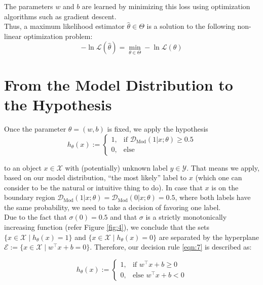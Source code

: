 The parameters $w$ and $b$ are learned by minimizing this loss using optimization algorithms such as gradient descent.\cite{murphy2012machine}\\

Thus, a maximum likelihood estimator $\hat{\theta} \in \Theta$ is a solution to the following non-linear optimization problem:
\begin{equation}
    -\ln \mathcal{L}(\hat{\theta}) = \min_{\theta \in \Theta} - \ln \mathcal{L}(\theta)
    \label{eqn:6}
\end{equation}

\section{From the Model Distribution to the Hypothesis} \label{hypothesis}

Once the parameter $\theta=(w,b)$ is fixed, we apply the hypothesis
\begin{equation}
    h_{\theta}(x) :=
    \begin{cases} 
        1, & \text{if } \mathcal{D}_{\text{Mod}}(1|x;\theta) \geq 0.5 \\
        0, & \text{else}
    \end{cases}
    \label{eqn:7}
\end{equation}

to an object $x \in \mathcal{X}$ with (potentially) unknown label $y \in \mathcal{Y}$. That means we apply, based on our model distribution, “the most likely” label to $x$ (which one can consider to be the natural or intuitive thing to do). In case that $x$ is on the boundary region $\mathcal{D}_{\text{Mod}}(1|x;\theta) = \mathcal{D}_{\text{Mod}}(0|x;\theta) = 0.5$, where both labels have the same probability, we need to take a decision of favoring one label.\\

Due to the fact that $\sigma(0)=0.5$ and that $\sigma$ is a strictly monotonically increasing function (refer Figure \ref{fig:4}), we conclude that the sets $\{ x \in \mathcal{X} \mid h_{\theta}(x) = 1 \}$ and $\{ x \in \mathcal{X} \mid h_{\theta}(x) = 0 \}$ are separated by the hyperplane $\mathcal{E} := \{ x \in \mathcal{X} \mid w^\top x + b = 0 \}$. Therefore, our decision rule \ref{eqn:7} is described as:

\begin{equation}
    h_{\theta}(x) :=
    \begin{cases} 
        1, & \text{if } w^\top x + b \geq 0 \\
        0, & \text{else } w^\top x + b < 0
    \end{cases}
    \label{eqn:8}
\end{equation}

